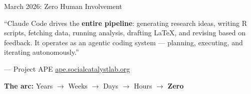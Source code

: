\documentclass[aspectratio=169, 11pt]{beamer}
\newcommand{\emphgold}[1]{\alert{\textbf{#1}}}
\newcommand{\sourceref}[1]{\vspace{0.15cm}\hfill{\tiny\textcolor{medgray}{#1}}}
\begin{document}
\begin{frame}{March 2026: Zero Human Involvement}
\vfill
\begin{bigquote}
\large
``Claude Code drives the \emphgold{entire pipeline}: generating research ideas, writing R scripts, fetching data, running analysis, drafting \LaTeX, and revising based on feedback. It operates as an agentic coding system --- planning, executing, and iterating autonomously.''
\end{bigquote}
\vspace{0.5cm}
\hfill\textcolor{medgray}{\normalsize --- Project APE}
\sourceref{\href{https://ape.socialcatalystlab.org/methodology}{ape.socialcatalystlab.org}}
\vspace{0.3cm}
\begin{center}
\large
\textbf{The arc:} Years $\rightarrow$ Weeks $\rightarrow$ Days $\rightarrow$ Hours $\rightarrow$ \emphgold{Zero}
\end{center}
\vfill
\end{frame}
\end{document}
